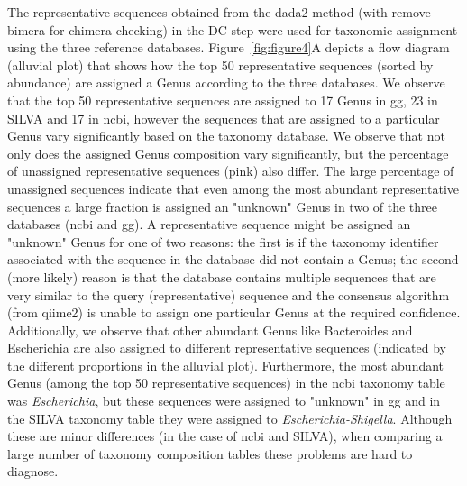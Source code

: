   The representative sequences obtained from the \ac{dada2} method (with remove bimera for chimera checking) in the DC step were used for taxonomic assignment using the three reference databases.
  Figure~\ref{fig:figure4}A depicts a flow diagram (alluvial plot) that shows how the top 50 representative sequences (sorted by abundance) are assigned a Genus according to the three databases.
  We observe that the top 50 representative sequences are assigned to 17 Genus in \ac{gg}, 23 in SILVA and 17 in \ac{ncbi}, however the sequences that are assigned to a particular Genus vary significantly based on the taxonomy database.
  We observe that not only does the assigned Genus composition vary significantly, but the percentage of unassigned representative sequences (pink) also differ.
  The large percentage of unassigned sequences indicate that even among the most abundant representative sequences a large fraction is assigned an "unknown" Genus in two of the three databases (\ac{ncbi} and \ac{gg}).
  A representative sequence might be assigned an "unknown" Genus for one of two reasons: the first is if the taxonomy identifier associated with the sequence in the database did not contain a Genus; the second (more likely) reason is that the database contains multiple sequences that are very similar to the query (representative) sequence and the consensus algorithm (from \ac{qiime2}) is unable to assign one particular Genus at the required confidence.
  Additionally, we observe that other abundant Genus like Bacteroides and Escherichia are also assigned to different representative sequences (indicated by the different proportions in the alluvial plot).
  Furthermore, the most abundant Genus (among the top 50 representative sequences) in the \ac{ncbi} taxonomy table was \textit{Escherichia}, but these sequences were assigned to "unknown" in \ac{gg} and in the SILVA taxonomy table they were assigned to \textit{Escherichia-Shigella}.
  Although these are minor differences (in the case of \ac{ncbi} and SILVA), when comparing a large number of taxonomy composition tables these problems are hard to diagnose.

